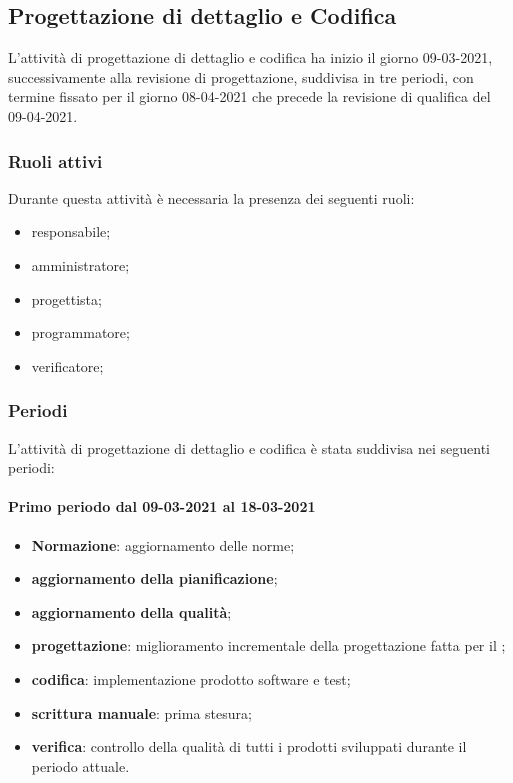 \newpage	 

\subsection{Progettazione di dettaglio e Codifica} 
L'attività di progettazione di dettaglio e codifica ha inizio il giorno 09-03-2021, successivamente alla 
revisione di progettazione, suddivisa in tre periodi, con termine fissato per il giorno 08-04-2021 
che precede la revisione di qualifica del 09-04-2021. 

\subsubsection{Ruoli attivi} 
Durante questa attività è necessaria la presenza dei seguenti ruoli: 
\begin{itemize} 
	\item responsabile; 
	\item amministratore; 
	\item progettista; 
	\item programmatore; 
	\item verificatore; 
\end{itemize} 

\subsubsection{Periodi} 
L'attività di progettazione di dettaglio e codifica è stata suddivisa nei seguenti periodi: 
\paragraph{Primo periodo dal 09-03-2021 al 18-03-2021} 
\begin{itemize} 
	\item \textbf{Normazione}: aggiornamento delle norme; 
	\item \textbf{aggiornamento della pianificazione}; 
	\item \textbf{aggiornamento della qualità}; 
	\item \textbf{progettazione}: miglioramento incrementale della progettazione fatta per il ; 
	\item \textbf{codifica}: implementazione prodotto software e test; 
	\item \textbf{scrittura manuale}: prima stesura; 
	\item \textbf{verifica}: controllo della qualità di tutti i prodotti sviluppati durante il periodo attuale. 
\end{itemize} 

